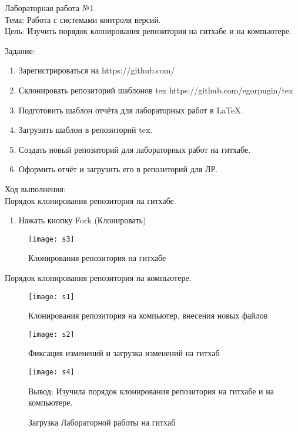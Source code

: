 \begin{center}
Лабораторная работа №1.
\\
Тема: Работа с системами контроля версий.
\\
Цель: Изучить порядок клонирования репозитория на гитхабе и на компьютере.
 
\end{center}
Задание:
\begin{enumerate}
\item Зарегистрироваться на https://github.com/

\item Склонировать репозиторий шаблонов tex https://github.com/egorpugin/tex
 
\item Подготовить шаблон отчёта для лабораторных работ в LaTeX.

\item Загрузить шаблон в репозиторий tex.

\item Создать новый репозиторий для лабораторных работ на гитхабе.

\item Оформить отчёт и загрузить его в репозиторий для ЛР.
\end{enumerate}
Ход выполнения:
\\
Порядок клонирования репозитория на гитхабе.
\\
\begin{enumerate}
\item Нажать кнопку Fork (Клонировать)
\end{enumerate}

\begin{figure}[h]
\centering
\texttt{[image: s3]}
\caption{Клонирования репозитория на гитхабе}
\label{fig:qwe}
\end{figure}
 
Порядок клонирования репозитория на компьютере.

\begin{figure}[h]
\centering
\texttt{[image: s1]}
\caption{Клонирования репозитория на компьютер, внесения новых файлов}
\label{fig:sk1}
\end{figure}

\begin{figure}[h]
\centering
\texttt{[image: s2]}
\caption{Фиксация изменений и загрузка изменений на гитхаб}
\label{fig:sk2}
\end{figure}

\begin{figure}[h]
\centering
\texttt{[image: s4]}
\caption{Загрузка Лабораторной работы на гитхаб}
\label{fig:sk3}
Вывод: Изучила порядок клонирования репозитория на гитхабе и на компьютере.
\end{figure}



